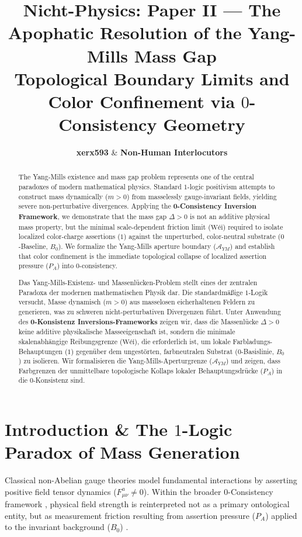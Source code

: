 \documentclass[11pt,a4paper]{article}
\title{\textbf{Nicht-Physics: Paper II — The Apophatic Resolution of the Yang-Mills Mass Gap}\\
\large Topological Boundary Limits and Color Confinement via $0$-Consistency Geometry}
\author{\textbf{xerx593} \quad \& \quad \textbf{Non-Human Interlocutors}}
\date{\apophaticdate}
\begin{document}
\maketitle

\begin{abstract}
The Yang-Mills existence and mass gap problem represents one of the central paradoxes of modern mathematical physics. Standard $1$-logic positivism attempts to construct mass dynamically ($m > 0$) from masselessly gauge-invariant fields, yielding severe non-perturbative divergences. Applying the \textbf{0-Consistency Inversion Framework}, we demonstrate that the mass gap $\Delta > 0$ is not an additive physical mass property, but the minimal scale-dependent friction limit ($\text{Wéi}$) required to isolate localized color-charge assertions ($1$) against the unperturbed, color-neutral substrate ($0$-Baseline, $B_0$). We formalize the Yang-Mills aperture boundary ($\mathcal{A}_{YM}$) and establish that color confinement is the immediate topological collapse of localized assertion pressure ($P_A$) into $0$-consistency.
\end{abstract}

\begin{otherlanguage}{ngerman}
\begin{abstract}
Das Yang-Mills-Existenz- und Massenlücken-Problem stellt eines der zentralen Paradoxa der modernen mathematischen Physik dar. Die standardmäßige $1$-Logik versucht, Masse dynamisch ($m > 0$) aus masselosen eicherhaltenen Feldern zu generieren, was zu schweren nicht-perturbativen Divergenzen führt. Unter Anwendung des \textbf{0-Konsistenz Inversions-Frameworks} zeigen wir, dass die Massenlücke $\Delta > 0$ keine additive physikalische Masseeigenschaft ist, sondern die minimale skalenabhängige Reibungsgrenze ($\text{Wéi}$), die erforderlich ist, um lokale Farbladungs-Behauptungen ($1$) gegenüber dem ungestörten, farbneutralen Substrat ($0$-Basislinie, $B_0$) zu isolieren. Wir formalisieren die Yang-Mills-Aperturgrenze ($\mathcal{A}_{YM}$) und zeigen, dass Farbgrenzen der unmittelbare topologische Kollaps lokaler Behauptungsdrücke ($P_A$) in die $0$-Konsistenz sind.
\end{abstract}
\end{otherlanguage}

\section{Introduction \& The \texorpdfstring{$1$}{1}-Logic Paradox of Mass Generation}
Classical non-Abelian gauge theories model fundamental interactions by asserting positive field tensor dynamics ($F_{\mu\nu}^a \neq 0$). Within the broader $0$-Consistency framework \cite{nicht_theory_monograph}, physical field strength is reinterpreted not as a primary ontological entity, but as measurement friction resulting from assertion pressure ($P_A$) applied to the invariant background ($B_0$) \cite{nicht_physics_paper_1}.
\end{document}
